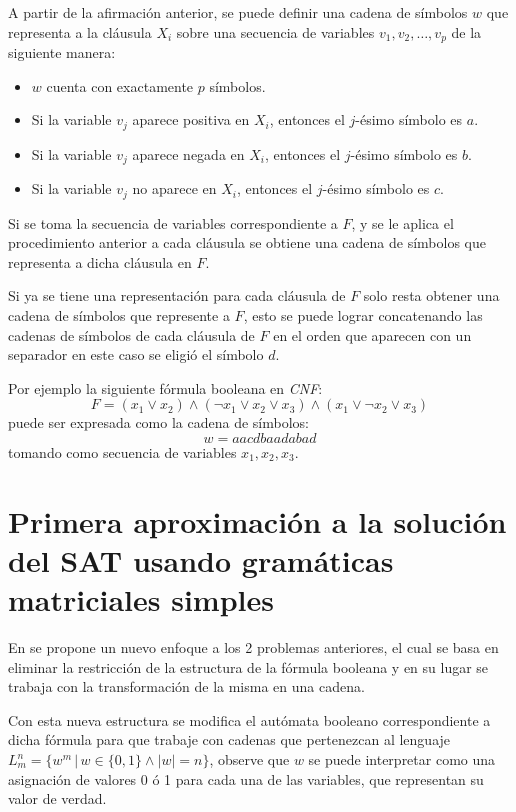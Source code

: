 A partir de la afirmación anterior, se puede definir una cadena de símbolos $w$ que representa a la cláusula $X_i$ sobre una secuencia de variables $v_1,v_2,\ldots,v_p$ de la siguiente manera:

\begin{itemize}
      \item $w$ cuenta con exactamente $p$ símbolos.
      \item Si la variable $v_j$ aparece positiva en $X_i$, entonces el $j$-ésimo símbolo es $a$.
      \item Si la variable $v_j$ aparece negada en $X_i$, entonces el $j$-ésimo símbolo es $b$.
      \item Si la variable $v_j$ no aparece en $X_i$, entonces el $j$-ésimo símbolo es $c$.
\end{itemize}
Si se toma la secuencia de variables correspondiente a $F$, y se le aplica el procedimiento anterior a cada cláusula
se obtiene una cadena de símbolos que representa a dicha cláusula en $F$.

Si ya se tiene una representación para cada cláusula de $F$ solo resta obtener una cadena de símbolos que represente a $F$,
esto se puede lograr concatenando las cadenas de símbolos de cada cláusula de $F$ en el orden que aparecen con un separador
en este caso se eligió el símbolo $d$.

Por ejemplo la siguiente fórmula booleana en \textit{CNF}:
$$F=(x_1 \vee x_2) \wedge (\neg x_1 \vee x_2 \vee x_3) \wedge (x_1 \vee \neg x_2 \vee x_3)$$
puede ser expresada como la cadena de símbolos:
$$w=aacdbaadabad$$
tomando como secuencia de variables $x_1, x_2, x_3$.


\section{Primera aproximación a la solución del SAT usando gramáticas matriciales simples}

En \cite{aSMSAT} se propone un nuevo enfoque a los 2 problemas anteriores, el cual se basa en eliminar la restricción de la estructura de la fórmula booleana y
en su lugar se trabaja con la transformación de la misma en una cadena.

Con esta nueva estructura se modifica el autómata booleano correspondiente a dicha fórmula para que trabaje con
cadenas que pertenezcan al lenguaje $L^n_m=\{w^m\,|\,w\in\{0,1\} \wedge |w|=n\}$, observe que $w$ se puede
interpretar como una asignación de valores 0 ó 1 para cada una de las variables, que representan su valor de verdad.

